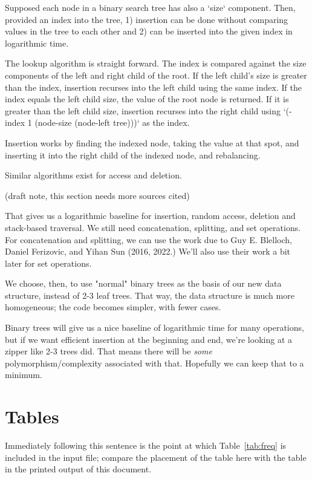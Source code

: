 \documentclass[sigconf]{acmart}
\begin{document}
Supposed each node in a binary search tree has also a `size` component. Then,
provided an index into the tree, 1) insertion can be done without comparing values
in the tree to each other and 2) can be inserted into the given index in
logarithmic time.

The lookup algorithm is straight forward. The index is compared against the size
components of the left and right child of the root. If the left child's size
is greater than the index, insertion recurses into the left child using the same
index. If the index equals the left child size, the value of the root node is returned.
If it is greater than the left child size, insertion recurses into the right
child using `(- index 1 (node-size (node-left tree)))` as the index.

Insertion works by finding the indexed node, taking the value at that spot,
and inserting it into the right child of the indexed node, and rebalancing.

Similar algorithms exist for access and deletion.

(draft note, this section needs more sources cited)

That gives us a logarithmic baseline for insertion, random access, deletion and
stack-based traversal. We still need concatenation, splitting, and set
operations. For concatenation and splitting, we can use the work due to Guy E.
Blelloch, Daniel Ferizovic, and Yihan Sun (2016, 2022.) We'll also use their
work a bit later for set operations.

We choose, then, to use "normal" binary trees as the
basis of our new data structure, instead of 2-3 leaf trees. That way, the data
structure is much more homogeneous; the code becomes simpler, with fewer cases.

Binary trees will give us a nice baseline of logarithmic time for many
operations, but if we want efficient insertion at the beginning and end, we're
looking at a zipper like 2-3 trees did. That means there will be \emph{some}
polymorphism/complexity associated with that. Hopefully we can keep that to a
minimum.



\section{Tables}


Immediately following this sentence is the point at which
Table~\ref{tab:freq} is included in the input file; compare the
placement of the table here with the table in the printed output of
this document.
\end{document}
